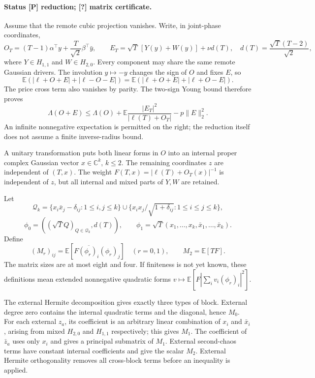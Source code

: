 \paragraph{Status [P] reduction; [?] matrix certificate.}
Assume that the remote cubic projection vanishes. Write, in joint-phase
coordinates,
\[
O_T=(T-1)\alpha^\top y+\frac{T}{\sqrt2}\beta^\top\bar y,
\qquad E_T=\sqrt T\,[Y(y)+W(y)]+\nu d(T),
\quad d(T)=\frac{\sqrt T(T-2)}{\sqrt2},
\]
where $Y\in H_{1,1}$ and $W\in H_{2,0}$. Every component may share the
same remote Gaussian drivers. The involution $y\mapsto-y$ changes the
sign of $O$ and fixes $E$, so
\[
\mathbb E(|\ell+O+E|+|\ell-O-E|)
=\mathbb E(|\ell+O+E|+|\ell+O-E|).
\]
The price cross term also vanishes by parity. The two-sign Young bound
therefore proves
\begin{equation}
\Lambda(O+E)\le\Lambda(O)+
\mathbb E\frac{|E_T|^2}{|\ell(T)+O_T|}-p\|E\|_2^2.
\label{eq:even-gram-young}
\end{equation}
An infinite nonnegative expectation is permitted on the right; the
reduction itself does not assume a finite inverse-radius bound.

A unitary transformation puts both linear forms in $O$ into an internal
proper complex Gaussian vector $x\in\mathbb C^k$, $k\le2$. The remaining
coordinates $z$ are independent of $(T,x)$. The weight
$F(T,x)=|\ell(T)+O_T(x)|^{-1}$ is independent of $z$, but all internal
and mixed parts of $Y,W$ are retained.

Let
\[
\mathcal Q_k=\{x_i\bar x_j-\delta_{ij}:1\le i,j\le k\}
\cup\{x_ix_j/\sqrt{1+\delta_{ij}}:1\le i\le j\le k\},
\]
\[
\phi_0=((\sqrt TQ)_{Q\in\mathcal Q_k},d(T)),\qquad
\phi_1=\sqrt T(x_1,\ldots,x_k,\bar x_1,\ldots,\bar x_k).
\]
Define
\[
(M_r)_{ij}=\mathbb E[F\overline{(\phi_r)_i}(\phi_r)_j]
\quad(r=0,1),\qquad M_2=\mathbb E[TF].
\]
The matrix sizes are at most eight and four. If finiteness is not yet
known, these definitions mean extended nonnegative quadratic forms
$v\mapsto\mathbb E[F|\sum_i v_i(\phi_r)_i|^2]$.

The external Hermite decomposition gives exactly three types of block.
External degree zero contains the internal quadratic terms and the
diagonal, hence $M_0$. For each external $z_a$, its coefficient is an
arbitrary linear combination of $x_i$ and $\bar x_i$, arising from mixed
$H_{2,0}$ and $H_{1,1}$ respectively; this gives $M_1$. The coefficient
of $\bar z_a$ uses only $x_i$ and gives a principal submatrix of $M_1$.
External second-chaos terms have constant internal coefficients and
give the scalar $M_2$. External Hermite orthogonality removes all
cross-block terms before an inequality is applied.

